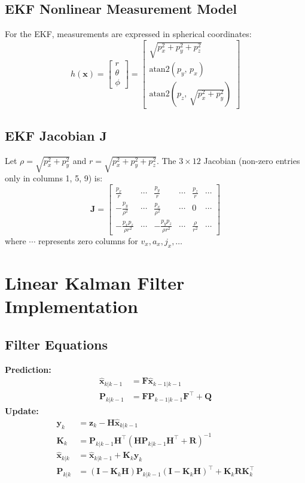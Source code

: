 \documentclass[12pt,a4paper]{article}
\newcommand{\bF}{\mathbf{F}}
\newcommand{\bQ}{\mathbf{Q}}
\newcommand{\bH}{\mathbf{H}}
\newcommand{\bP}{\mathbf{P}}
\newcommand{\bK}{\mathbf{K}}
\newcommand{\bR}{\mathbf{R}}
\newcommand{\bI}{\mathbf{I}}
\newcommand{\bz}{\mathbf{z}}
\newcommand{\by}{\mathbf{y}}
\newcommand{\bJ}{\mathbf{J}}
\begin{document}
\subsection{EKF Nonlinear Measurement Model}
For the EKF, measurements are expressed in spherical coordinates:
\[
    h(\mathbf{x}) = \begin{bmatrix} r \\ \theta \\ \phi \end{bmatrix} =
    \begin{bmatrix}
        \sqrt{p_x^2 + p_y^2 + p_z^2} \\
        \text{atan2}(p_y,\, p_x) \\
        \text{atan2}\!\left(p_z,\, \sqrt{p_x^2+p_y^2}\right)
    \end{bmatrix}
\]

\subsection{EKF Jacobian \texorpdfstring{$\mathbf{J}$}{J}}
Let $\rho = \sqrt{p_x^2+p_y^2}$ and $r = \sqrt{p_x^2+p_y^2+p_z^2}$.
The $3\times12$ Jacobian (non-zero entries only in columns 1, 5, 9) is:
\[
    \bJ = \begin{bmatrix}
        \frac{p_x}{r}         & \cdots & \frac{p_y}{r}         & \cdots & \frac{p_z}{r}         & \cdots \\
        -\frac{p_y}{\rho^2}   & \cdots & \frac{p_x}{\rho^2}    & \cdots & 0                     & \cdots \\
        -\frac{p_x p_z}{\rho r^2} & \cdots & -\frac{p_y p_z}{\rho r^2} & \cdots & \frac{\rho}{r^2} & \cdots
    \end{bmatrix}
\]
where $\cdots$ represents zero columns for $v_x, a_x, j_x, \ldots$

\section{Linear Kalman Filter Implementation}

\subsection{Filter Equations}
\textbf{Prediction:}
\begin{align}
    \hat{\mathbf{x}}_{k|k-1} &= \bF\hat{\mathbf{x}}_{k-1|k-1} \\
    \bP_{k|k-1}               &= \bF\bP_{k-1|k-1}\bF^\top + \bQ
\end{align}
\textbf{Update:}
\begin{align}
    \by_k     &= \bz_k - \bH\hat{\mathbf{x}}_{k|k-1} \\
    \bK_k     &= \bP_{k|k-1}\bH^\top\left(\bH\bP_{k|k-1}\bH^\top + \bR\right)^{-1} \\
    \hat{\mathbf{x}}_{k|k} &= \hat{\mathbf{x}}_{k|k-1} + \bK_k\by_k \\
    \bP_{k|k} &= (\bI-\bK_k\bH)\bP_{k|k-1}(\bI-\bK_k\bH)^\top + \bK_k\bR\bK_k^\top
\end{align}
\end{document}
